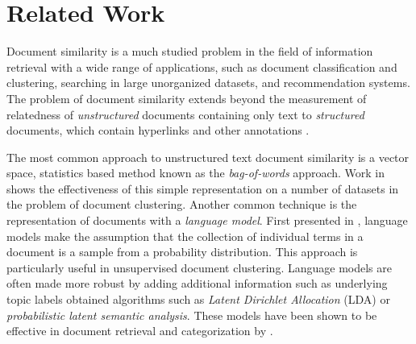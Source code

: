 \documentclass[11pt]{article}
\begin{document}
\section{Related Work} \label{sec:RelatedWork}

Document similarity is a much studied problem in the field of information retrieval with a wide range of applications, such as document classification and clustering, searching in large unorganized datasets, and recommendation systems. The problem of document similarity extends beyond the measurement of relatedness of \emph{unstructured} documents containing only text to \emph{structured} documents, which contain hyperlinks and other annotations \cite{Manning2008}. 

The most common approach to unstructured text document similarity is a vector space, statistics based method known as the  \emph{bag-of-words} approach. Work in \cite{Huang2008} shows the effectiveness of this simple representation on a number of datasets in the problem of document clustering. Another common technique is the representation of documents with a \emph{language model}. First presented in \cite{Ponte1998}, language models make the assumption that the collection of individual terms in a document is a sample from a probability distribution. This approach is particularly useful in unsupervised document clustering.  Language models are often made more robust by adding additional information such as underlying topic labels obtained algorithms such as \emph{Latent Dirichlet Allocation} (LDA) or \emph{probabilistic latent semantic analysis}.  These models have been shown to be effective in document retrieval and categorization by \cite{Hofmann2000}. 
\end{document}
